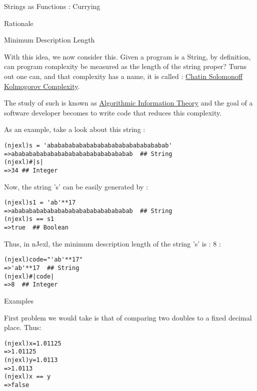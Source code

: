 \begin{section}{Strings as Functions : Currying}
\begin{subsection}{Rationale}
\end{subsection}

\begin{subsection}{Minimum Description Length}

With this idea, we now consider this. Given a program is a String, by definition, can program complexity be measured as the length of the string proper? Turns out one can, and that complexity has a name, it is called : \href{https://en.wikipedia.org/wiki/Kolmogorov\_complexity}{Chatin Solomonoff Kolmogorov Complexity}.

The study of such is known as 
\href{https://en.wikipedia.org/wiki/Algorithmic\_information\_theory}{Algorithmic Information Theory} 
and the goal of a software developer becomes to write code that reduces this complexity.

As an example, take a look about this string :

\begin{lstlisting}[style=all]
(njexl)s = 'ababababababababababababababababab'
=>ababababababababababababababababab  ## String
(njexl)#|s|
=>34 ## Integer
\end{lstlisting}

Now, the string 's' can be easily generated by :

\begin{lstlisting}[style=all]
(njexl)s1 = 'ab'**17
=>ababababababababababababababababab  ## String 
(njexl)s == s1
=>true  ## Boolean
\end{lstlisting}

Thus, in nJexl, the minimum description length of the string 's' is : 8 :

\begin{lstlisting}[style=all]
(njexl)code="'ab'**17"
=>'ab'**17  ## String 
(njexl)#|code|
=>8  ## Integer
\end{lstlisting}

\end{subsection}


\begin{subsection}{Examples}

First problem we would take is that of comparing two doubles to a fixed decimal place. Thus:

\begin{lstlisting}[style=all]
(njexl)x=1.01125
=>1.01125
(njexl)y=1.0113
=>1.0113
(njexl)x == y
=>false
\end{lstlisting}


\end{subsection}
\end{section}
